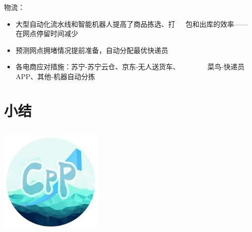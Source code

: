 \documentclass{beamer}
\begin{document}
\begin{frame}
 物流：
\begin{itemize}
\item 大型自动化流水线和智能机器人提高了商品拣选、打\ \ \ 包和出库的效率——在网点停留时间减少
\item 预测网点拥堵情况提前准备，自动分配最优快递员
\item 各电商应对措施：苏宁-苏宁云仓、京东-无人送货车、\ \ \ \ \ \ \ \ 菜鸟-快递员APP、其他-机器自动分拣
\end{itemize}
\end{frame}


\section{小结\ \ \ \ \ \ \ \ \ \ \ \ \ \ \ \ \ \ \ \ \ \ \ \ \ \ \ }
\subsection{}


\begin{frame}
\begin{center}
  \includegraphics[width=5cm,height=5cm]{CPP.jpg}
\end{center}
\end{frame}
\end{document}
